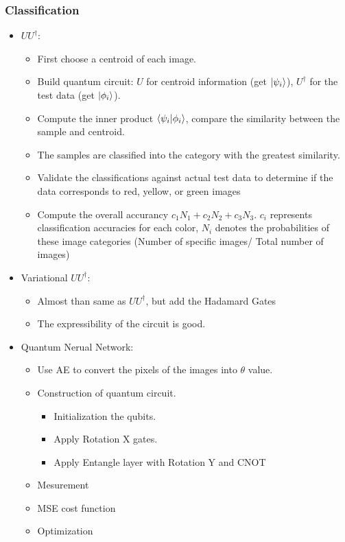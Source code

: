 \documentclass[12pt,a4paper]{article}
\begin{document}
\subsubsection*{Classification}
\begin{itemize}
    \item $UU^{\dag}$:
          \begin{itemize}
            \item First choose a centroid of each image.
            \item Build quantum circuit: $U$ for centroid information (get $\ket{\psi_i}$), $U^{\dag}$ for the test data (get $\ket{\phi_i}$).
            \item Compute the inner product $\braket{\psi_i | \phi_i}$, compare the similarity between the sample and centroid.
            \item The samples are classified into the category with the greatest similarity.
            \item Validate the classifications against actual test data to determine if the data corresponds to red, yellow, or green images
            \item Compute the overall accurancy $c_1N_1 + c_2N_2 + c_3N_3$. $c_i$ represents classification accuracies for each color, $N_i$ denotes the probabilities of these image categories (Number of specific images/ Total number of images)
          \end{itemize}
    \item Variational $UU^{\dag}$:
          \begin{itemize}
            \item Almost than same as $UU^{\dag}$, but add the Hadamard Gates
            \item The expressibility of the circuit is good.
          \end{itemize}
    \item Quantum Nerual Network:
          \begin{itemize}
            \item Use AE to convert the pixels of the images into $\theta$ value.
            \item Construction of quantum circuit.
                  \begin{itemize}
                    \item Initialization the qubits.
                    \item Apply Rotation X gates.
                    \item Apply Entangle layer with Rotation Y and CNOT
                  \end{itemize}
            \item Mesurement
            \item MSE cost function
            \item Optimization
          \end{itemize}
\end{itemize}
\end{document}
